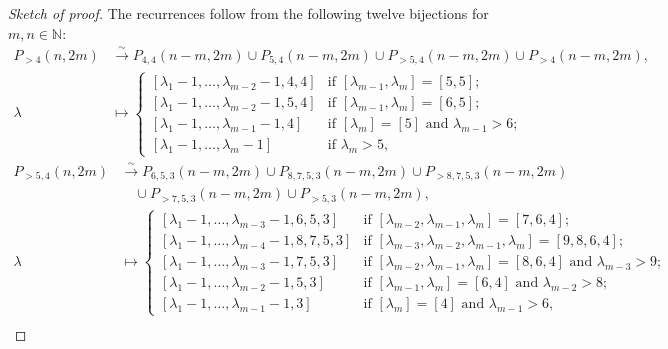 \documentclass[a4paper, 12pt, reqno]{amsart}
\theoremstyle{remark}
\numberwithin{equation}{subsection}
\begin{document}
\begin{proof}[Sketch of proof]
  The recurrences follow from the following twelve bijections for $m, n \in \mathbb{N}$:
  \begin{align*}
    P_{>4}(n, 2m) &\xrightarrow{\sim} P_{4, 4}(n - m, 2m) \cup P_{5, 4}(n - m, 2m) \cup P_{>5, 4}(n - m, 2m) \cup P_{>4}(n - m, 2m), \\
    \lambda &\mapsto
              \begin{cases}
                [\lambda_1 - 1, \dots, \lambda_{m - 2} - 1, 4, 4] &\text{if }[\lambda_{m - 1}, \lambda_m] = [5, 5]; \\
                [\lambda_1 - 1, \dots, \lambda_{m - 2} - 1, 5, 4] &\text{if }[\lambda_{m - 1}, \lambda_m] = [6, 5]; \\
                [\lambda_1 - 1, \dots, \lambda_{m - 1} - 1, 4] &\text{if }[\lambda_m] = [5]\text{ and }\lambda_{m - 1} > 6; \\
                [\lambda_1 - 1, \dots, \lambda_m - 1] &\text{if }\lambda_m > 5,
              \end{cases}
  \end{align*}
  \begin{align*}
    P_{>5, 4}(n, 2m) &\xrightarrow{\sim} P_{6, 5, 3}(n - m, 2m) \cup P_{8, 7, 5, 3}(n - m, 2m) \cup P_{>8, 7, 5, 3}(n - m, 2m) \\
    &\quad \cup P_{>7, 5, 3}(n - m, 2m) \cup P_{>5, 3}(n - m, 2m), \\
    \lambda &\mapsto
              \begin{cases}
                [\lambda_1 - 1, \dots, \lambda_{m - 3} - 1, 6, 5, 3] &\text{if }[\lambda_{m - 2}, \lambda_{m - 1}, \lambda_m] = [7, 6, 4]; \\
                [\lambda_1 - 1, \dots, \lambda_{m - 4} - 1, 8, 7, 5, 3] &\text{if }[\lambda_{m - 3}, \lambda_{m - 2}, \lambda_{m - 1}, \lambda_m] = [9, 8, 6, 4]; \\
                [\lambda_1 - 1, \dots, \lambda_{m - 3} - 1, 7, 5, 3] &\text{if }[\lambda_{m - 2}, \lambda_{m - 1}, \lambda_m] = [8, 6, 4]\text{ and }\lambda_{m - 3} > 9; \\
                [\lambda_1 - 1, \dots, \lambda_{m - 2} - 1, 5, 3] &\text{if }[\lambda_{m - 1}, \lambda_m] = [6, 4]\text{ and }\lambda_{m - 2} > 8; \\
                [\lambda_1 - 1, \dots, \lambda_{m - 1} -1, 3] &\text{if }[\lambda_m] = [4]\text{ and }\lambda_{m - 1} > 6,
              \end{cases}
  \end{align*}
  \begin{align*}

\end{align*}
\end{proof}
\end{document}
